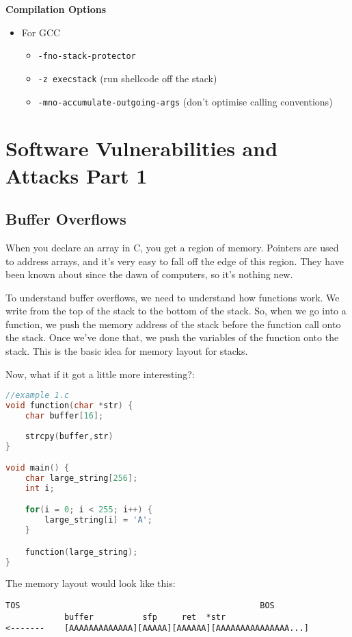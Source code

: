 \documentclass[11pt,a4paper,titlepage,dvipsnames,cmyk]{scrartcl}
\begin{document}
\textbf{Compilation Options}
\begin{itemize}
    \item For GCC
    \begin{itemize}
        \item \texttt{-fno-stack-protector}
        \item \texttt{-z execstack} (run shellcode off the stack)
        \item \texttt{-mno-accumulate-outgoing-args} (don't optimise calling conventions)
    \end{itemize}
\end{itemize}

\section{Software Vulnerabilities and Attacks Part 1}
\subsection{Buffer Overflows}
When you declare an array in C, you get a region of memory. Pointers are used to address arrays, and it's very easy to fall off the edge of this region. They have been known about since the dawn of computers, so it's nothing new.

To understand buffer overflows, we need to understand how functions work. We write from the top of the stack to the bottom of the stack. So, when we go into a function, we push the memory address of the stack before the function call onto the stack. Once we've done that, we push the variables of the function onto the stack. This is the basic idea for memory layout for stacks.

Now, what if it got a little more interesting?:
\begin{lstlisting}[language=C]
//example 1.c
void function(char *str) {
    char buffer[16];
    
    strcpy(buffer,str)
}

void main() {
    char large_string[256];
    int i;

    for(i = 0; i < 255; i++) {
        large_string[i] = 'A';
    }

    function(large_string);
}
\end{lstlisting}

The memory layout would look like this:
\begin{lstlisting}
TOS                                                 BOS
            buffer          sfp     ret  *str
<-------    [AAAAAAAAAAAAA][AAAAA][AAAAAA][AAAAAAAAAAAAAAA...]
\end{lstlisting}
\end{document}

